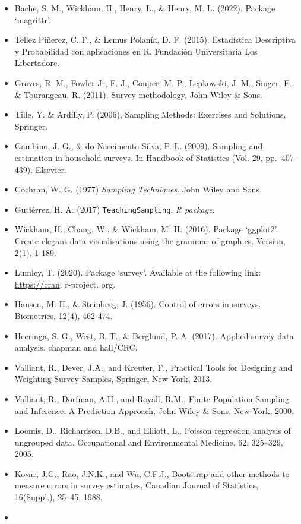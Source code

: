 \documentclass[
  12pt,
]{book}
\begin{document}
\begin{itemize}
\item
  Bache, S. M., Wickham, H., Henry, L., \& Henry, M. L. (2022). Package `magrittr'.
\item
  Tellez Piñerez, C. F., \& Lemus Polanía, D. F. (2015). Estadística Descriptiva y Probabilidad con aplicaciones en R. Fundación Universitaria Los Libertadore.
\item
  Groves, R. M., Fowler Jr, F. J., Couper, M. P., Lepkowski, J. M., Singer, E., \& Tourangeau, R. (2011). Survey methodology. John Wiley \& Sons.
\item
  Tille, Y. \& Ardilly, P. (2006), Sampling Methods: Exercises and Solutions, Springer.
\item
  Gambino, J. G., \& do Nascimento Silva, P. L. (2009). Sampling and estimation in household surveys. In Handbook of Statistics (Vol. 29, pp.~407-439). Elsevier.
\item
  Cochran, W. G. (1977) \emph{Sampling Techniques}. John Wiley and Sons.
\item
  Gutiérrez, H. A. (2017) \texttt{TeachingSampling}. \emph{R package}.
\item
  Wickham, H., Chang, W., \& Wickham, M. H. (2016). Package `ggplot2'. Create elegant data visualisations using the grammar of graphics. Version, 2(1), 1-189.
\item
  Lumley, T. (2020). Package `survey'. Available at the following link: \url{https://cran}. r-project. org.
\item
  Hansen, M. H., \& Steinberg, J. (1956). Control of errors in surveys. Biometrics, 12(4), 462-474.
\item
  Heeringa, S. G., West, B. T., \& Berglund, P. A. (2017). Applied survey data analysis. chapman and hall/CRC.
\item
  Valliant, R., Dever, J.A., and Kreuter, F., Practical Tools for Designing and Weighting Survey Samples, Springer, New York, 2013.
\item
  Valliant, R., Dorfman, A.H., and Royall, R.M., Finite Population Sampling and Inference: A Prediction Approach, John Wiley \& Sons, New York, 2000.
\item
  Loomis, D., Richardson, D.B., and Elliott, L., Poisson regression analysis of ungrouped data, Occupational and Environmental Medicine, 62, 325--329, 2005.
\item
  Kovar, J.G., Rao, J.N.K., and Wu, C.F.J., Bootstrap and other methods to measure errors in survey estimates, Canadian Journal of Statistics, 16(Suppl.), 25--45, 1988.
\item

\end{itemize}
\end{document}
